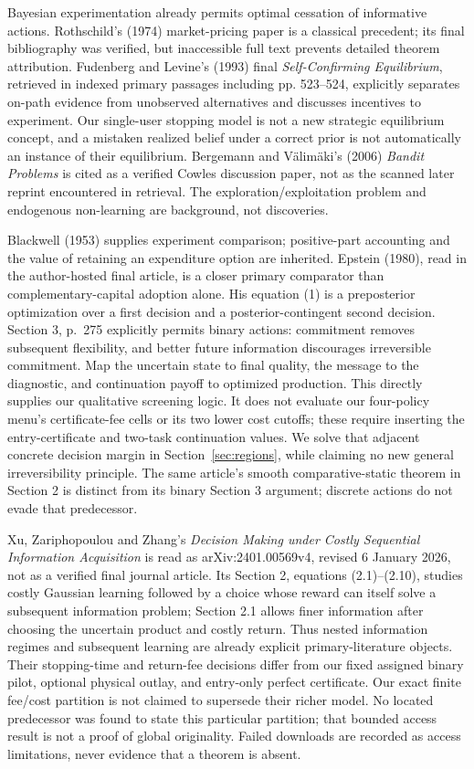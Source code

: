 \documentclass[11pt]{article}
\begin{document}
Bayesian experimentation already permits optimal cessation of informative actions. Rothschild's (1974) market-pricing paper is a classical precedent; its final bibliography was verified, but inaccessible full text prevents detailed theorem attribution. Fudenberg and Levine's (1993) final \emph{Self-Confirming Equilibrium}, retrieved in indexed primary passages including pp. 523--524, explicitly separates on-path evidence from unobserved alternatives and discusses incentives to experiment. Our single-user stopping model is not a new strategic equilibrium concept, and a mistaken realized belief under a correct prior is not automatically an instance of their equilibrium. Bergemann and V\"alim\"aki's (2006) \emph{Bandit Problems} is cited as a verified Cowles discussion paper, not as the scanned later reprint encountered in retrieval. The exploration/exploitation problem and endogenous non-learning are background, not discoveries.

Blackwell (1953) supplies experiment comparison; positive-part accounting and the value of retaining an expenditure option are inherited. Epstein (1980), read in the author-hosted final article, is a closer primary comparator than complementary-capital adoption alone. His equation (1) is a preposterior optimization over a first decision and a posterior-contingent second decision. Section 3, p.~275 explicitly permits binary actions: commitment removes subsequent flexibility, and better future information discourages irreversible commitment. Map the uncertain state to final quality, the message to the diagnostic, and continuation payoff to optimized production. This directly supplies our qualitative screening logic. It does not evaluate our four-policy menu's certificate-fee cells or its two lower cost cutoffs; these require inserting the entry-certificate and two-task continuation values. We solve that adjacent concrete decision margin in Section~\ref{sec:regions}, while claiming no new general irreversibility principle. The same article's smooth comparative-static theorem in Section 2 is distinct from its binary Section 3 argument; discrete actions do not evade that predecessor.

Xu, Zariphopoulou and Zhang's \emph{Decision Making under Costly Sequential Information Acquisition} is read as arXiv:2401.00569v4, revised 6 January 2026, not as a verified final journal article. Its Section 2, equations (2.1)--(2.10), studies costly Gaussian learning followed by a choice whose reward can itself solve a subsequent information problem; Section 2.1 allows finer information after choosing the uncertain product and costly return. Thus nested information regimes and subsequent learning are already explicit primary-literature objects. Their stopping-time and return-fee decisions differ from our fixed assigned binary pilot, optional physical outlay, and entry-only perfect certificate. Our exact finite fee/cost partition is not claimed to supersede their richer model. No located predecessor was found to state this particular partition; that bounded access result is not a proof of global originality. Failed downloads are recorded as access limitations, never evidence that a theorem is absent.
\end{document}
